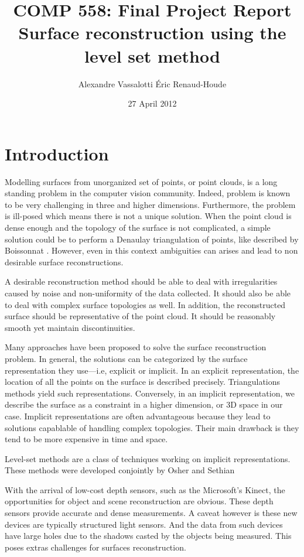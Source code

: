 \documentclass{article}
\author{Alexandre Vassalotti \quad \'{E}ric Renaud-Houde}
\title{COMP 558: Final Project Report \\
  \large \textbf{Surface reconstruction using the level set method}
}
\date{27 April 2012}
\begin{document}
\maketitle
\section{Introduction}
Modelling surfaces from unorganized set of points, or point clouds, is a long
standing problem in the computer vision community. Indeed, problem is known to
be very challenging in three and higher dimensions. Furthermore, the problem
is ill-posed which means there is not a unique solution. When the point cloud
is dense enough and the topology of the surface is not complicated, a simple
solution could be to perform a Denaulay triangulation of points, like
described by Boissonnat \cite{boissonnat1984geometric}. However, even in this
context ambiguities can arises and lead to non desirable surface
reconstructions.

A desirable reconstruction method should be able to deal with irregularities
caused by noise and non-uniformity of the data collected. It should also be
able to deal with complex surface topologies as well. In addition, the
reconstructed surface should be representative of the point cloud. It should
be reasonably smooth yet maintain discontinuities.

Many approaches have been proposed to solve the surface reconstruction
problem. In general, the solutions can be categorized by the surface
representation they use---i.e, explicit or implicit. In an explicit
representation, the location of all the points on the surface is described
precisely. Triangulations methods yield such representations. Conversely, in
an implicit representation, we describe the surface as a constraint in a
higher dimension, or 3D space in our case. Implicit representations are often
advantageous because they lead to solutions capablable of handling complex
topologies. Their main drawback is they tend to be more expensive in time and
space.

Level-set methods are a class of techniques working on implicit
representations. These methods were developed conjointly by Osher and Sethian
\cite{sethian1999level}

With the arrival of low-cost depth sensors, such as the Microsoft's Kinect,
the opportunities for object and scene reconstruction are obvious. These depth
sensors provide accurate and dense measurements. A caveat however is these new
devices are typically structured light sensors. And the data from such devices
have large holes due to the shadows casted by the objects being measured. This
poses extras challenges for surfaces reconstruction.
\end{document}
